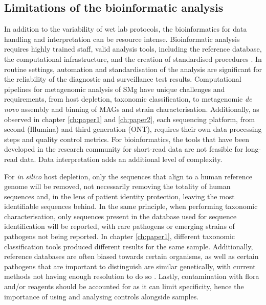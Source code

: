 \subsection{Limitations of the bioinformatic analysis}

In addition to the variability of wet lab protocols, the bioinformatics for data handling and interpretation can be resource intense. Bioinformatic analysis requires highly trained staff, valid analysis tools, including the reference database, the computational infrastructure, and the creation of standardised procedures \citep{petersen_third-generation_2019}. In routine settings, automation and standardisation of the analysis are significant for the reliability of the diagnostic and surveillance test results. Computational pipelines for metagenomic analysis of \ac{SMg} have unique challenges and requirements, from host depletion, taxonomic classification, to metagenomic \textit{de novo} assembly and binning of \ac{MAG}s and strain characterisation. Additionally, as observed in chapter \ref{ch:paper1} and \ref{ch:paper2}, each sequencing platform, from second (Illumina) and third generation (\ac{ONT}), requires their own data processing steps and quality control metrics. For bioinformatics, the tools that have been developed in the research community for short-read data are not feasible for long-read data. Data interpretation adds an additional level of complexity.  

For \textit{in silico} host depletion, only the sequences that align to a human reference genome will be removed, not necessarily removing the totality of human sequences and, in the lens of patient identity protection, leaving the most identifiable sequences behind. In the same principle, when performing taxonomic characterisation, only sequences present in the database used for sequence identification will be reported, with rare pathogens or emerging strains of pathogens not being reported. In chapter \ref{ch:paper1}, different taxonomic classification tools produced different results for the same sample. Additionally, reference databases are often biased towards certain organisms, as well as certain pathogens that are important to distinguish are similar genetically, with current methods not having enough resolution to do so \citep{gu_clinical_2019}. Lastly, contamination with flora and/or reagents should be accounted for as it can limit specificity, hence the importance of using and analysing controls alongside samples. 

